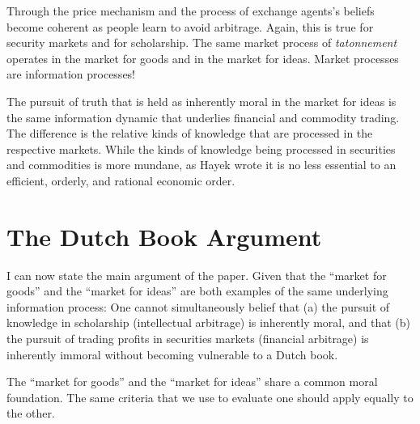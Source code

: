 \documentclass[11pt,]{article}
\begin{document}
Through the price mechanism and the process of exchange agents's beliefs
become coherent as people learn to avoid arbitrage. Again, this is true
for security markets and for scholarship. The same market process of
\emph{tatonnement} operates in the market for goods and in the market
for ideas. Market processes are information processes!

The pursuit of truth that is held as inherently moral in the market for
ideas is the same information dynamic that underlies financial and
commodity trading. The difference is the relative kinds of knowledge
that are processed in the respective markets. While the kinds of
knowledge being processed in securities and commodities is more mundane,
as Hayek wrote it is no less essential to an efficient, orderly, and
rational economic order.

\section{The Dutch Book Argument}\label{the-dutch-book-argument}

I can now state the main argument of the paper. Given that the ``market
for goods'' and the ``market for ideas'' are both examples of the same
underlying information process: One cannot simultaneously belief that
(a) the pursuit of knowledge in scholarship (intellectual arbitrage) is
inherently moral, and that (b) the pursuit of trading profits in
securities markets (financial arbitrage) is inherently immoral without
becoming vulnerable to a Dutch book.

The ``market for goods'' and the ``market for ideas'' share a common
moral foundation. The same criteria that we use to evaluate one should
apply equally to the other.

\newpage
\singlespacing 

\end{document}
